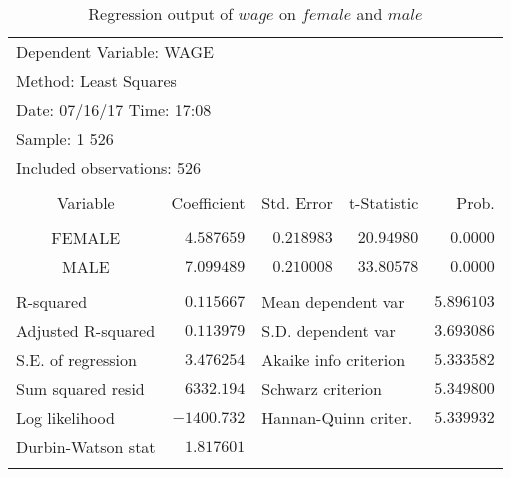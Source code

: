 \documentclass[12pt]{report}
\begin{document}
\begin{table}[H]
	\centering
	\begin{tabular}{lrrrr}
		\multicolumn{3}{l}{Dependent Variable: WAGE}&\multicolumn{1}{c}{}&\multicolumn{1}{c}{}\\
		\multicolumn{3}{l}{Method: Least Squares}&\multicolumn{1}{c}{}&\multicolumn{1}{c}{}\\
		\multicolumn{3}{l}{Date: 07/16/17   Time: 17:08}&\multicolumn{1}{c}{}&\multicolumn{1}{c}{}\\
		\multicolumn{2}{l}{Sample: 1 526}&\multicolumn{1}{c}{}&\multicolumn{1}{c}{}&\multicolumn{1}{c}{}\\
		\multicolumn{3}{l}{Included observations: 526}&\multicolumn{1}{c}{}&\multicolumn{1}{c}{}\\
		[4.5pt] \hline \\ [-4.5pt]
		\multicolumn{1}{c}{Variable}&\multicolumn{1}{r}{Coefficient}&\multicolumn{1}{r}{Std. Error}&\multicolumn{1}{r}{t-Statistic}&\multicolumn{1}{r}{Prob.}\\
		[4.5pt] \hline \\ [-4.5pt]
		\multicolumn{1}{c}{FEMALE}&\multicolumn{1}{r}{$4.587659$}&\multicolumn{1}{r}{$0.218983$}&\multicolumn{1}{r}{$20.94980$}&\multicolumn{1}{r}{$0.0000$}\\
		\multicolumn{1}{c}{MALE}&\multicolumn{1}{r}{$7.099489$}&\multicolumn{1}{r}{$0.210008$}&\multicolumn{1}{r}{$33.80578$}&\multicolumn{1}{r}{$0.0000$}\\
		[4.5pt] \hline \\ [-4.5pt]
		\multicolumn{1}{l}{R-squared}&\multicolumn{1}{r}{$0.115667$}&\multicolumn{2}{l}{Mean dependent var}&\multicolumn{1}{r}{$5.896103$}\\
		\multicolumn{1}{l}{Adjusted R-squared}&\multicolumn{1}{r}{$0.113979$}&\multicolumn{2}{l}{S.D. dependent var}&\multicolumn{1}{r}{$3.693086$}\\
		\multicolumn{1}{l}{S.E. of regression}&\multicolumn{1}{r}{$3.476254$}&\multicolumn{2}{l}{Akaike info criterion}&\multicolumn{1}{r}{$5.333582$}\\
		\multicolumn{1}{l}{Sum squared resid}&\multicolumn{1}{r}{$6332.194$}&\multicolumn{2}{l}{Schwarz criterion}&\multicolumn{1}{r}{$5.349800$}\\
		\multicolumn{1}{l}{Log likelihood}&\multicolumn{1}{r}{$-1400.732$}&\multicolumn{2}{l}{Hannan-Quinn criter.}&\multicolumn{1}{r}{$5.339932$}\\
		\multicolumn{1}{l}{Durbin-Watson stat}&\multicolumn{1}{r}{$1.817601$}&\multicolumn{1}{c}{}&\multicolumn{1}{c}{}&\multicolumn{1}{c}{}\\
		[4.5pt] \hline \\ [-4.5pt]
	\end{tabular}
	\caption{Regression output of $wage$ on $female$ and $male$}
	\label{tbl:regout2}
\end{table}
\end{document}
